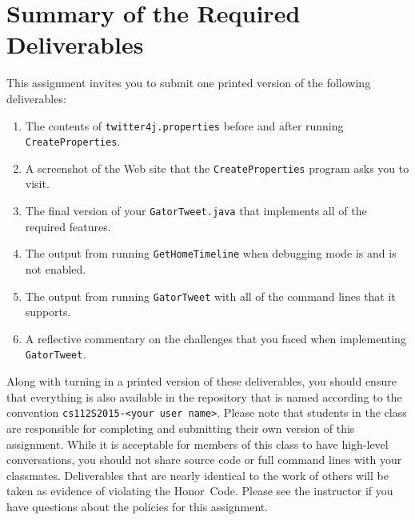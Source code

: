 \section*{Summary of the Required Deliverables}

  This assignment invites you to submit one printed version of the following deliverables: 

  \begin{enumerate}
    \item The contents of {\tt twitter4j.properties} before and after running {\tt CreateProperties}.
    \item A screenshot of the Web site that the {\tt CreateProperties} program asks you to visit.
    \item The final version of your {\tt GatorTweet.java} that implements all of the required features.
    \item The output from running {\tt GetHomeTimeline} when debugging mode is and is not enabled.
    \item The output from running {\tt GatorTweet} with all of the command lines that it supports.
    \item A reflective commentary on the challenges that you faced when implementing {\tt GatorTweet}.
  \end{enumerate}

  Along with turning in a printed version of these deliverables, you should ensure that everything is also available in
  the repository that is named according to the convention {\tt cs112S2015-<your user name>}. Please note that students
  in the class are responsible for completing and submitting their own version of this assignment.    While it is
  acceptable for members of this class to have high-level conversations, you should not share source code or full
  command lines with your classmates.  Deliverables that are nearly identical to the work of others will be taken as
  evidence of violating the \mbox{Honor Code}.  Please see the instructor if you have questions about the policies for
  this assignment.

  
